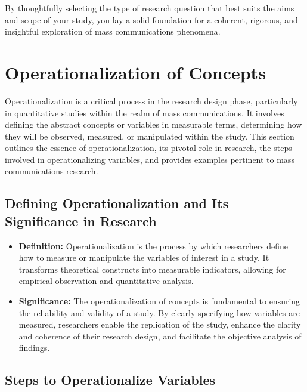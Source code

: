 \documentclass[
]{book}
\begin{document}
By thoughtfully selecting the type of research question that best suits the aims and scope of your study, you lay a solid foundation for a coherent, rigorous, and insightful exploration of mass communications phenomena.

\hypertarget{operationalization-of-concepts}{%
\section{Operationalization of Concepts}\label{operationalization-of-concepts}}

Operationalization is a critical process in the research design phase, particularly in quantitative studies within the realm of mass communications. It involves defining the abstract concepts or variables in measurable terms, determining how they will be observed, measured, or manipulated within the study. This section outlines the essence of operationalization, its pivotal role in research, the steps involved in operationalizing variables, and provides examples pertinent to mass communications research.

\hypertarget{defining-operationalization-and-its-significance-in-research}{%
\subsection*{Defining Operationalization and Its Significance in Research}\label{defining-operationalization-and-its-significance-in-research}}

\begin{itemize}
\item
  \textbf{Definition:} Operationalization is the process by which researchers define how to measure or manipulate the variables of interest in a study. It transforms theoretical constructs into measurable indicators, allowing for empirical observation and quantitative analysis.
\item
  \textbf{Significance:} The operationalization of concepts is fundamental to ensuring the reliability and validity of a study. By clearly specifying how variables are measured, researchers enable the replication of the study, enhance the clarity and coherence of their research design, and facilitate the objective analysis of findings.
\end{itemize}

\hypertarget{steps-to-operationalize-variables}{%
\subsection*{Steps to Operationalize Variables}\label{steps-to-operationalize-variables}}
\end{document}
